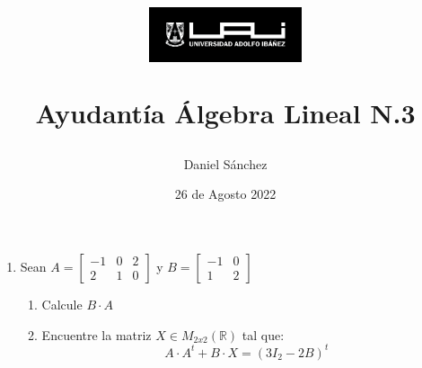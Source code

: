 \documentclass[12pt]{article}
\begin{document}
\title{
    \begin{figure}[ht]
        \centering
        \includegraphics[width = 0.4\textwidth, ]{../../logo-uai.jpg}\\
    \end{figure}
    Ayudant\'ia \'Algebra Lineal N.3}
\date{26 de Agosto 2022}
\author{Daniel S\'anchez}
\maketitle

\begin{enumerate}
    \item Sean $A= \begin{bmatrix}
                  -1 & 0 & 2 \\
                  2  & 1 & 0
              \end{bmatrix}$ y $B=\begin{bmatrix}
                  -1 & 0 \\
                  1  & 2
              \end{bmatrix}$
          \begin{enumerate}
              \item Calcule $B\cdot A$
              \item Encuentre la matriz $X \in M_{2x2}(\mathbb{R})$ tal que:
                    $$A\cdot A^t+B\cdot X=(3I_2-2B)^t$$
          \end{enumerate}
          
\end{enumerate}
\end{document}
